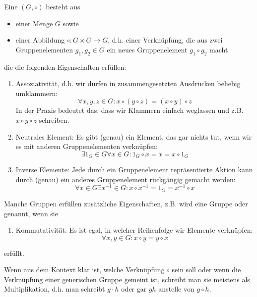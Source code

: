 \begin{definition}
Eine  $(G,\circ)$ besteht aus
\begin{itemize}
\item einer Menge $G$ sowie
\item einer Abbildung $\circ: G\times G\to G$, d.h. einer Verknüpfung, die aus zwei Gruppenelementen $g_1,g_2\in G$ ein neues Gruppenelement $g_1\circ g_2$ macht
\end{itemize}
die die folgenden Eigenschaften erfüllen:
\begin{enumerate}[label=(G\arabic*)]
\item Assoziativität, d.h. wir dürfen in zusammengesetzten Ausdrücken beliebig umklammern:
\[\forall x,y,z\in G: x\circ(y\circ z) = (x\circ y)\circ z\]
In der Praxis bedeutet das, dass wir Klammern einfach weglassen und z.B. $x\circ y\circ z$ schreiben.
\item Neutrales Element: Es gibt (genau) ein Element, das gar nichts tut, wenn wir es mit anderen Gruppenelementen verknüpfen:
\[\exists 1_G\in G \forall x\in G: 1_G\circ x = x = x\circ 1_G\]
\item Inverse Elemente: Jede durch ein Gruppenelement repräsentierte Aktion kann durch (genau) ein anderes Gruppenelement rückgängig gemacht werden:
\[\forall x\in G\exists x^{-1}\in G: x\circ x^{-1}=1_G=x^{-1}\circ x\]
\end{enumerate}
Manche Gruppen erfüllen zusätzliche Eigenschaften, z.B. wird eine Gruppe  oder  genannt, wenn sie
\begin{enumerate}[label=(G\arabic*),resume]
\item Kommutativität: Es ist egal, in welcher Reihenfolge wir Elemente verknüpfen:
\[\forall x,y\in G: x\circ y = y\circ x\]
\end{enumerate}
erfüllt.

Wenn aus dem Kontext klar ist, welche Verknüpfung $\circ$ sein soll oder wenn die Verknüpfung einer generischen Gruppe gemeint ist, schreibt man sie meistens als Multiplikation, d.h. man schreibt $g\cdot h$ oder gar $gh$ anstelle von $g\circ h$.
\end{definition}

